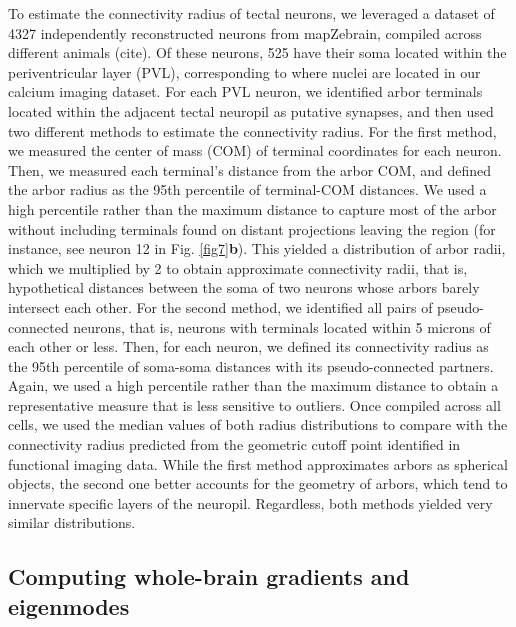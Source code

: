 \documentclass{article}
\begin{document}
To estimate the connectivity radius of tectal neurons, we leveraged a dataset of 4327 independently reconstructed neurons from mapZebrain, compiled across different animals (cite). Of these neurons, 525 have their soma located within the periventricular layer (PVL), corresponding to where nuclei are located in our calcium imaging dataset. For each PVL neuron, we identified arbor terminals located within the adjacent tectal neuropil as putative synapses, and then used two different methods to estimate the connectivity radius. For the first method, we measured the center of mass (COM) of terminal coordinates for each neuron. Then, we measured each terminal's distance from the arbor COM, and defined the arbor radius as the 95th percentile of terminal-COM distances. We used a high percentile rather than the maximum distance to capture most of the arbor without including terminals found on distant projections leaving the region (for instance, see neuron 12 in Fig. \ref{fig7}\textbf{b}). This yielded a distribution of arbor radii, which we multiplied by 2 to obtain approximate connectivity radii, that is, hypothetical distances between the soma of two neurons whose arbors barely intersect each other. For the second method, we identified all pairs of pseudo-connected neurons, that is, neurons with terminals located within 5 microns of each other or less. Then, for each neuron, we defined its connectivity radius as the 95th percentile of soma-soma distances with its pseudo-connected partners. Again, we used a high percentile rather than the maximum distance to obtain a representative measure that is less sensitive to outliers. Once compiled across all cells, we used the median values of both radius distributions to compare with the connectivity radius predicted from the geometric cutoff point identified in functional imaging data. While the first method approximates arbors as spherical objects, the second one better accounts for the geometry of arbors, which tend to innervate specific layers of the neuropil. Regardless, both methods yielded very similar distributions.

\subsection*{Computing whole-brain gradients and eigenmodes}
\end{document}
